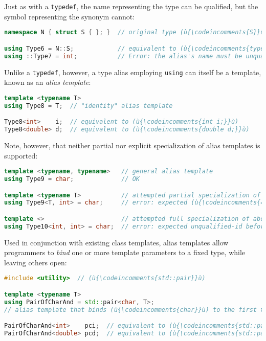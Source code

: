 \noindent Just as with a \texttt{typedef}, the name representing the type can be
qualified, but the symbol representing the synonym cannot:

\begin{lstlisting}[language=C++]
namespace N { struct S { }; }  // original type (ù{\codeincomments{S}}ù) defined with namespace (ù{\codeincomments{N}}ù)

using Type6 = N::S;            // equivalent to (ù{\codeincomments{typedef N::S Type6;}}ù)
using ::Type7 = int;           // Error: the alias's name must be unqualified.
\end{lstlisting}

\noindent Unlike a \texttt{typedef}, however, a type alias employing
\texttt{using} can itself be a template, known as an \emph{alias
template}:

\begin{lstlisting}[language=C++]
template <typename T>
using Type8 = T;  // "identity" alias template

Type8<int>    i;  // equivalent to (ù{\codeincomments{int i;}}ù)
Type8<double> d;  // equivalent to (ù{\codeincomments{double d;}}ù)
\end{lstlisting}

\noindent Note, however, that neither partial nor explicit specialization of alias
templates is supported:

\begin{lstlisting}[language=C++]
template <typename, typename>   // general alias template
using Type9 = char;             // OK

template <typename T>           // attempted partial specialization of above
using Type9<T, int> = char;     // error: expected (ù{\codeincomments{=}}ù) before (ù{\codeincomments{<}}ù) token

template <>                     // attempted full specialization of above
using Type10<int, int> = char;  // error: expected unqualified-id before (ù{\codeincomments{using}}ù)
\end{lstlisting}

\noindent Used in conjunction with existing class templates, alias templates allow
programmers to \emph{bind} one or more template parameters to a fixed
type, while leaving others open:

\begin{lstlisting}[language=C++]
#include <utility>  // (ù{\codeincomments{std::pair}}ù)

template <typename T>
using PairOfCharAnd = std::pair<char, T>;
// alias template that binds (ù{\codeincomments{char}}ù) to the first type parameter of (ù{\codeincomments{std::pair}}ù)

PairOfCharAnd<int>    pci;  // equivalent to (ù{\codeincomments{std::pair<char, int> pci;}}ù)
PairOfCharAnd<double> pcd;  // equivalent to (ù{\codeincomments{std::pair<char, double> pcd;}}ù)
\end{lstlisting}

